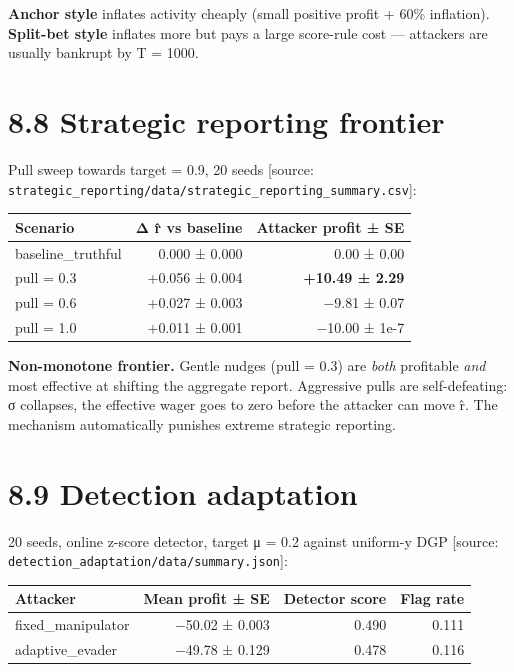 \documentclass[11pt,a4paper,openany]{report}
\begin{document}
\textbf{Anchor style} inflates activity cheaply (small positive profit +
60\% inflation). \textbf{Split-bet style} inflates more but pays a large
score-rule cost — attackers are usually bankrupt by T = 1000.

\section{8.8 Strategic reporting frontier}

Pull sweep towards target = 0.9, 20 seeds [source:
\texttt{strategic\_reporting/data/strategic\_reporting\_summary.csv}]:

\begin{center}
\small
\begin{tabular}{lrr}
\toprule
\textbf{Scenario} & \textbf{Δ r̂ vs baseline} & \textbf{Attacker profit ± SE} \\
\midrule
baseline\_truthful & 0.000 ± 0.000 & 0.00 ± 0.00 \\
pull = 0.3 & +0.056 ± 0.004 & \textbf{+10.49 ± 2.29} \\
pull = 0.6 & +0.027 ± 0.003 & −9.81 ± 0.07 \\
pull = 1.0 & +0.011 ± 0.001 & −10.00 ± 1e-7 \\
\bottomrule
\end{tabular}
\end{center}

\textbf{Non-monotone frontier.} Gentle nudges (pull = 0.3) are \emph{both}
profitable \emph{and} most effective at shifting the aggregate report.
Aggressive pulls are self-defeating: σ collapses, the effective wager
goes to zero before the attacker can move r̂. The mechanism
automatically punishes extreme strategic reporting.

\section{8.9 Detection adaptation}

20 seeds, online z-score detector, target μ = 0.2 against uniform-y
DGP [source:
\texttt{detection\_adaptation/data/summary.json}]:

\begin{center}
\small
\begin{tabular}{lrrr}
\toprule
\textbf{Attacker} & \textbf{Mean profit ± SE} & \textbf{Detector score} & \textbf{Flag rate} \\
\midrule
fixed\_manipulator & −50.02 ± 0.003 & 0.490 & 0.111 \\
adaptive\_evader & −49.78 ± 0.129 & 0.478 & 0.116 \\
\bottomrule
\end{tabular}
\end{center}
\end{document}

